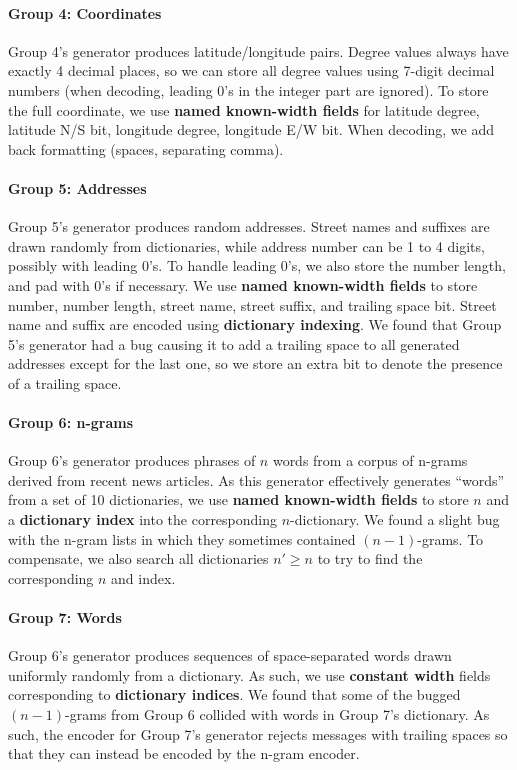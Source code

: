 \documentclass[titlepage]{article}
\begin{document}
\paragraph{Group 4: Coordinates} Group 4's generator produces latitude/longitude pairs. Degree values always have exactly 4 decimal places, so we can store all degree values using 7-digit decimal numbers (when decoding, leading 0's in the integer part are ignored). To store the full coordinate, we use \textbf{named known-width fields} for latitude degree, latitude N/S bit, longitude degree, longitude E/W bit. When decoding, we add back formatting (spaces, separating comma).

\paragraph{Group 5: Addresses} Group 5's generator produces random addresses. Street names and suffixes are drawn randomly from dictionaries, while address number can be 1 to 4 digits, possibly with leading 0's. To handle leading 0's, we also store the number length, and pad with 0's if necessary. We use \textbf{named known-width fields} to store number, number length, street name, street suffix, and trailing space bit. Street name and suffix are encoded using \textbf{dictionary indexing}. We found that Group 5's generator had a bug causing it to add a trailing space to all generated addresses except for the last one, so we store an extra bit to denote the presence of a trailing space.

\paragraph{Group 6: n-grams} Group 6's generator produces phrases of $n$ words from a corpus of n-grams derived from recent news articles. As this generator effectively generates ``words'' from a set of 10 dictionaries, we use \textbf{named known-width fields} to store $n$ and a \textbf{dictionary index} into the corresponding $n$-dictionary. We found a slight bug with the n-gram lists in which they sometimes contained $(n-1)$-grams. To compensate, we also search all dictionaries $n' \ge n$ to try to find the corresponding $n$ and index.

\paragraph{Group 7: Words} Group 6's generator produces sequences of space-separated words drawn uniformly randomly from a dictionary. As such, we use \textbf{constant width} fields corresponding to \textbf{dictionary indices}. We found that some of the bugged $(n-1)$-grams from Group 6 collided with words in Group 7's dictionary. As such, the encoder for Group 7's generator rejects messages with trailing spaces so that they can instead be encoded by the n-gram encoder.
\end{document}
